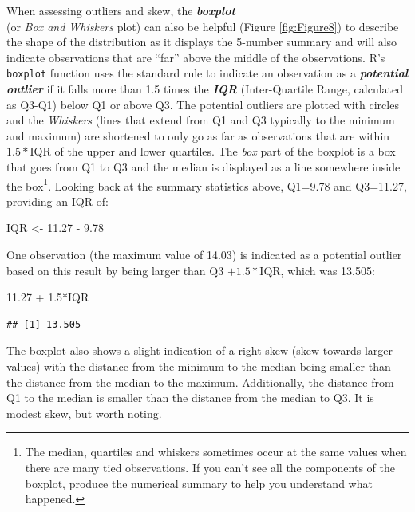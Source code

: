 \documentclass[]{book}
\newenvironment{Shaded}{\begin{snugshade}}{\end{snugshade}}
\newcommand{\FloatTok}[1]{\textcolor[rgb]{0.00,0.00,0.81}{{#1}}}
\newcommand{\StringTok}[1]{\textcolor[rgb]{0.31,0.60,0.02}{{#1}}}
\newcommand{\NormalTok}[1]{{#1}}
\let\rmarkdownfootnote\footnote%
\def\footnote{\protect\rmarkdownfootnote}
\begin{document}
When assessing outliers and skew, the \textbf{\emph{boxplot}}\\
(or \emph{Box and Whiskers} plot) can also be helpful (Figure
\ref{fig:Figure8}) to describe the shape of the distribution as it
displays the 5-number summary and will also indicate observations that
are ``far'' above the middle of the observations. R's \texttt{boxplot}
function uses the standard rule to indicate an observation as a
\textbf{\emph{potential outlier}} if it falls more than 1.5 times the
\textbf{\emph{IQR}} (Inter-Quartile Range, calculated as Q3-Q1) below Q1
or above Q3. The potential outliers are plotted with circles and the
\emph{Whiskers} (lines that extend from Q1 and Q3 typically to the
minimum and maximum) are shortened to only go as far as observations
that are within \(1.5*\)IQR of the upper and lower quartiles. The
\emph{box} part of the boxplot is a box that goes from Q1 to Q3 and the
median is displayed as a line somewhere inside the box\footnote{The
  median, quartiles and whiskers sometimes occur at the same values when
  there are many tied observations. If you can't see all the components
  of the boxplot, produce the numerical summary to help you understand
  what happened.}. Looking back at the summary statistics above, Q1=9.78
and Q3=11.27, providing an IQR of:

\begin{Shaded}
\begin{Highlighting}[]
\NormalTok{IQR <-}\StringTok{ }\FloatTok{11.27} \NormalTok{-}\StringTok{ }\FloatTok{9.78}
\end{Highlighting}
\end{Shaded}

One observation (the maximum value of 14.03) is indicated as a potential
outlier based on this result by being larger than Q3 \(+1.5*\)IQR, which
was 13.505:

\begin{Shaded}
\begin{Highlighting}[]
\FloatTok{11.27} \NormalTok{+}\StringTok{ }\FloatTok{1.5}\NormalTok{*IQR}
\end{Highlighting}
\end{Shaded}

\begin{verbatim}
## [1] 13.505
\end{verbatim}

The boxplot also shows a slight indication of a right skew (skew towards
larger values) with the distance from the minimum to the median being
smaller than the distance from the median to the maximum. Additionally,
the distance from Q1 to the median is smaller than the distance from the
median to Q3. It is modest skew, but worth noting.
\end{document}
